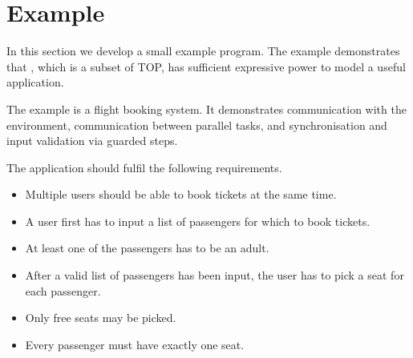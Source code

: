 
\section{Example}

In this section we develop a small example program.
The example demonstrates that \TOPHAT, which is a subset of TOP, has sufficient expressive power to model a useful application.

The example is a flight booking system.
It demonstrates communication with the environment, communication between parallel tasks, and synchronisation and input validation via guarded steps.

The application should fulfil the following requirements.
\begin{itemize}
\item Multiple users should be able to book tickets at the same time.
\item A user first has to input a list of passengers for which to book tickets.
\item At least one of the passengers has to be an adult.
\item After a valid list of passengers has been input, the user has to pick a seat for each passenger.
\item Only free seats may be picked.
\item Every passenger must have exactly one seat.
\end{itemize}
